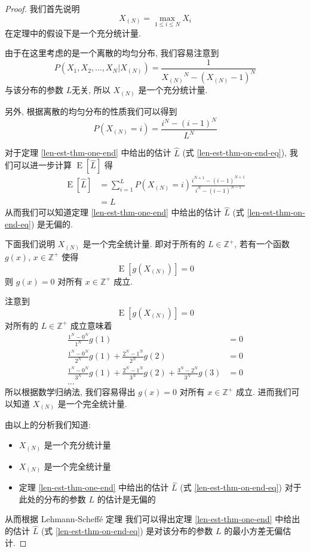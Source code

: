 \begin{proof}
我们首先说明 
\[
X_{(N)} = \max_{1 \leq i \leq N} X_i
\] 
在定理中的假设下是一个充分统计量. 

由于在这里考虑的是一个离散的均匀分布, 我们容易注意到
\[
P(X_1, X_2, \ldots, X_N | X_{(N)}) = \frac{1}{ {X_{(N)}}^N - (X_{(N)} - 1)^N }
\]
与该分布的参数 $L$无关, 所以 $X_{(N)}$ 是一个充分统计量. 

另外, 根据离散的均匀分布的性质我们可以得到
\[
P(X_{(N)} = i) = \frac{ i^N - (i - 1)^N }{L^N}
\]

对于定理 \ref{len-est-thm-one-end} 中给出的估计 $\hat{L}$ 
(式 \eqref{len-est-thm-on-end-eq}), 
我们可以进一步计算 $\operatorname{E}[\hat{L}]$ 得
\begin{align*}
\operatorname{E}[\hat{L}] &= \sum_{i=1}^L P(X_{(N)} = i) 
    \frac{i^{N+1} - (i-1)^{N+1}}{i^N-(i-1)^{N-1}} \\
&= L
\end{align*}
从而我们可以知道定理 \ref{len-est-thm-one-end} 中给出的估计 $\hat{L}$ 
(式 \eqref{len-est-thm-on-end-eq}) 是无偏的. 

下面我们说明 $X_{(N)}$ 是一个完全统计量. 
即对于所有的 $L \in \mathbb{Z}^+$, 若有一个函数 $g(x)$, $x \in \mathbb{Z}^+$ 使得
\[
\operatorname{E}[g(X_{(N)})] = 0
\]
则 $g(x) = 0$ 对所有 $x \in \mathbb{Z}^+$ 成立. 

注意到
\[
\operatorname{E}[g(X_{(N)})] = 0
\]
对所有的 $L \in \mathbb{Z}^+$ 成立意味着
\begin{align*}
\frac{1^N - 0^N}{1^N} g(1) &= 0 \\
\frac{1^N - 0^N}{2^N} g(1) + \frac{2^N - 1^N}{2^N} g(2) &= 0 \\
\frac{1^N - 0^N}{3^N} g(1) + \frac{2^N - 1^N}{3^N} g(2) + \frac{3^N - 2^N}{3^N} g(3) &= 0 \\
\ldots
\end{align*}
所以根据数学归纳法, 我们容易得出 $g(x) = 0$ 对所有 $x \in \mathbb{Z}^+$ 成立. 
进而我们可以知道 $X_{(N)}$ 是一个完全统计量. 

由以上的分析我们知道: 
\begin{itemize}
\item $X_{(N)}$ 是一个充分统计量
\item $X_{(N)}$ 是一个完全统计量
\item 定理 \ref{len-est-thm-one-end} 中给出的估计 $\hat{L}$ 
(式 \eqref{len-est-thm-on-end-eq}) 对于此处的分布的参数 $L$ 的估计是无偏的 
\end{itemize}
从而根据 Lehmann-Scheff{\'e} 定理
\cite{lehmann2012completeness.p1, lehmann2012completeness.p2} 
我们可以得出定理 \ref{len-est-thm-one-end} 中给出的估计 $\hat{L}$ 
(式 \eqref{len-est-thm-on-end-eq}) 是对该分布的参数 $L$ 的最小方差无偏估计. 

\end{proof}

